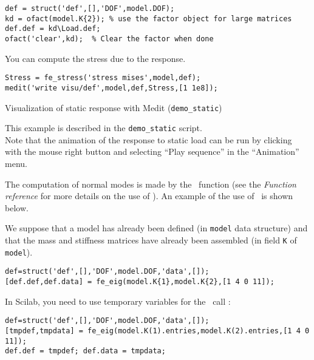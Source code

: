 \begin{verbatim}
def = struct('def',[],'DOF',model.DOF);
kd = ofact(model.K{2}); % use the factor object for large matrices
def.def = kd\Load.def;
ofact('clear',kd);  % Clear the factor when done
\end{verbatim}
You can compute the stress due to the response.
\begin{verbatim}
Stress = fe_stress('stress mises',model,def);
medit('write visu/def',model,def,Stress,[1 1e8]);
\end{verbatim}

\begin{center}
\begin{figure}[H]
\centering
{} %
\end{figure}

Visualization of static response with Medit ({\tt demo\_static})
\end{center}
This example is described in the {\tt demo\_static} script.\\
Note that the animation of the response to static load can be run by clicking with the mouse right button and selecting ``Play sequence'' in the ``Animation'' menu.

\newpage

The computation of normal modes is made by the \feeig\ function (see the {\sl Function reference} for more details on the use of \feeig). An example of the use of \feeig\ is shown below.

We suppose that a model has already been defined (in {\tt model} data structure) and that the mass and stiffness matrices have already been assembled (in field {\tt K} of {\tt model}).\\

\begin{verbatim}
def=struct('def',[],'DOF',model.DOF,'data',[]);
[def.def,def.data] = fe_eig(model.K{1},model.K{2},[1 4 0 11]);
\end{verbatim}
In Scilab, you need to use temporary variables for the \feeig\ call :
\begin{verbatim}
def=struct('def',[],'DOF',model.DOF,'data',[]);
[tmpdef,tmpdata] = fe_eig(model.K(1).entries,model.K(2).entries,[1 4 0 11]);
def.def = tmpdef; def.data = tmpdata;
\end{verbatim}

